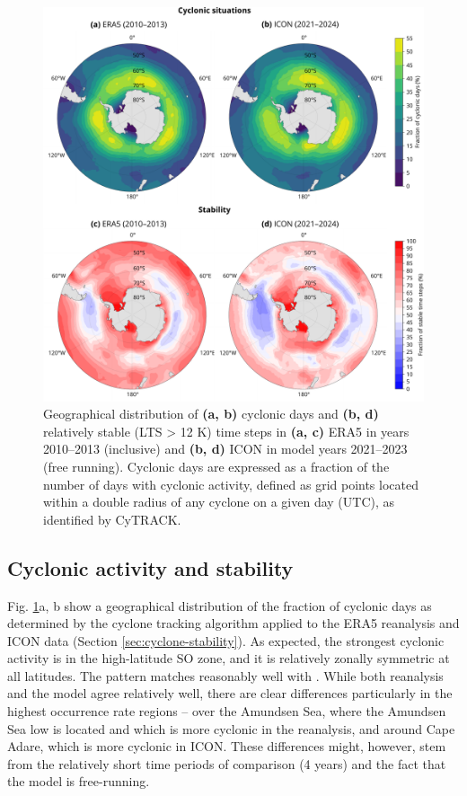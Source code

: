 \documentclass[12pt,a4paper]{article}
\begin{document}
\begin{figure}[p!]
\centering
\includegraphics[width=\textwidth]{img/cyc_stab_dist.pdf}
\caption{
Geographical distribution of \textbf{(a, b)} cyclonic days and \textbf{(b, d)}
relatively stable (LTS > 12 K) time steps in \textbf{(a, c)} ERA5 in years
2010--2013 (inclusive) and \textbf{(b, d)} ICON in model years 2021--2023 (free
running). Cyclonic days are expressed as a fraction of the number of days with
cyclonic activity, defined as grid points located within a double radius of any
cyclone on a given day (UTC), as identified by CyTRACK.
}
\label{fig:cyclone-stability}
\end{figure}

\subsection{Cyclonic activity and stability}

Fig. \ref{fig:cyclone-stability}a, b show a geographical distribution of the fraction
of cyclonic days as determined by the cyclone tracking algorithm applied to the
ERA5 reanalysis and ICON data (Section \ref{sec:cyclone-stability}). As
expected, the strongest cyclonic activity is in the high-latitude SO zone, and
it is relatively zonally symmetric at all latitudes.  The pattern matches reasonably well with \cite{hoskins2005}. While both reanalysis and
the model agree relatively well, there are clear differences particularly in the highest occurrence rate regions -- over the Amundsen Sea, where the Amundsen Sea low is located \cite{turner2013} and which is
more cyclonic in the reanalysis, and around Cape Adare, which is more cyclonic
in ICON. These differences might, however, stem from the relatively short time
periods of comparison (4 years) and the fact that the model is free-running.
\end{document}
